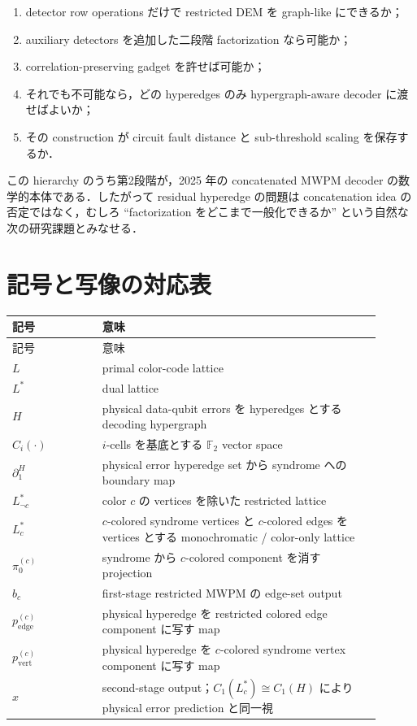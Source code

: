 \documentclass[a4paper,11pt]{ltjsarticle}
\newcommand{\F}{\mathbb{F}_2}
\newcommand{\bd}{\partial}
\begin{document}
\begin{enumerate}
  \item detector row operations だけで restricted DEM を graph-like にできるか；
  \item auxiliary detectors を追加した二段階 factorization なら可能か；
  \item correlation-preserving gadget を許せば可能か；
  \item それでも不可能なら，どの hyperedges のみ hypergraph-aware decoder に渡せばよいか；
  \item その construction が circuit fault distance と sub-threshold scaling を保存するか．
\end{enumerate}

この hierarchy のうち第2段階が，2025 年の concatenated MWPM decoder の数学的本体である．したがって residual hyperedge の問題は concatenation idea の否定ではなく，むしろ ``factorization をどこまで一般化できるか'' という自然な次の研究課題とみなせる．

\appendix
\section{記号と写像の対応表}

\begin{longtable}{p{0.22\linewidth}p{0.68\linewidth}}
\toprule
記号 & 意味\\
\midrule
\endfirsthead
\toprule
記号 & 意味\\
\midrule
\endhead
$L$ & primal color-code lattice\\
$L^*$ & dual lattice\\
$H$ & physical data-qubit errors を hyperedges とする decoding hypergraph\\
$C_i(\cdot)$ & $i$-cells を基底とする $\F$ vector space\\
$\bd_1^H$ & physical error hyperedge set から syndrome への boundary map\\
$L^*_{\neg c}$ & color $c$ の vertices を除いた restricted lattice\\
$L^*_c$ & $c$-colored syndrome vertices と $c$-colored edges を vertices とする monochromatic / color-only lattice\\
$\pi_0^{(c)}$ & syndrome から $c$-colored component を消す projection\\
$b_c$ & first-stage restricted MWPM の edge-set output\\
$p_{\mathrm{edge}}^{(c)}$ & physical hyperedge を restricted colored edge component に写す map\\
$p_{\mathrm{vert}}^{(c)}$ & physical hyperedge を $c$-colored syndrome vertex component に写す map\\
$x$ & second-stage output；$C_1(L^*_c)\cong C_1(H)$ により physical error prediction と同一視\\
\bottomrule
\end{longtable}
\end{document}
